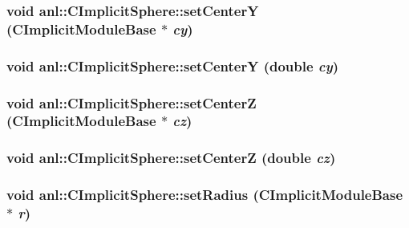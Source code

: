 \label{classanl_1_1CImplicitSphere_a8e7d41f51040ed8732e6015a5a02f206}
\hypertarget{classanl_1_1CImplicitSphere_a21348b975828308142a2cbdd62e76b42}{
\subsubsection[{setCenterY}]{\setlength{\rightskip}{0pt plus 5cm}void anl::CImplicitSphere::setCenterY ({\bf CImplicitModuleBase} $\ast$ {\em cy})}}
\label{classanl_1_1CImplicitSphere_a21348b975828308142a2cbdd62e76b42}
\hypertarget{classanl_1_1CImplicitSphere_a7df3f8521d551f9b08014c30a6a917d0}{
\subsubsection[{setCenterY}]{\setlength{\rightskip}{0pt plus 5cm}void anl::CImplicitSphere::setCenterY (double {\em cy})}}
\label{classanl_1_1CImplicitSphere_a7df3f8521d551f9b08014c30a6a917d0}
\hypertarget{classanl_1_1CImplicitSphere_a62662af517040582cdecf30e8b1e5874}{
\subsubsection[{setCenterZ}]{\setlength{\rightskip}{0pt plus 5cm}void anl::CImplicitSphere::setCenterZ ({\bf CImplicitModuleBase} $\ast$ {\em cz})}}
\label{classanl_1_1CImplicitSphere_a62662af517040582cdecf30e8b1e5874}
\hypertarget{classanl_1_1CImplicitSphere_a9c6f2313e77a5a0072a0adaf21f0c1d9}{
\subsubsection[{setCenterZ}]{\setlength{\rightskip}{0pt plus 5cm}void anl::CImplicitSphere::setCenterZ (double {\em cz})}}
\label{classanl_1_1CImplicitSphere_a9c6f2313e77a5a0072a0adaf21f0c1d9}
\hypertarget{classanl_1_1CImplicitSphere_ae4b3a1cfdacf4bfb1aaa77a87eb887e8}{
\subsubsection[{setRadius}]{\setlength{\rightskip}{0pt plus 5cm}void anl::CImplicitSphere::setRadius ({\bf CImplicitModuleBase} $\ast$ {\em r})}}
